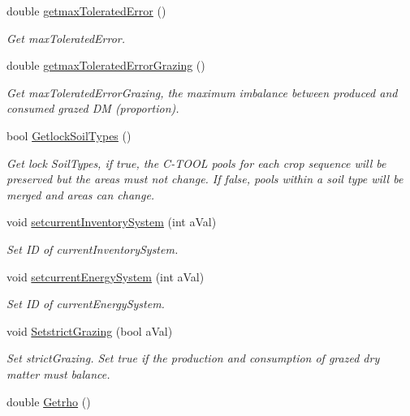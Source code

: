 \begin{DoxyCompactItemize}
double \mbox{\hyperlink{class_global_vars_ac5ca0cf675cbc4a5fc18f93f714b03bc}{getmax\+Tolerated\+Error}} ()
\begin{DoxyCompactList}\small\item\em Get max\+Tolerated\+Error. \end{DoxyCompactList}\item 
double \mbox{\hyperlink{class_global_vars_a6cf904264e03e8361a2e4c45b88fdfcd}{getmax\+Tolerated\+Error\+Grazing}} ()
\begin{DoxyCompactList}\small\item\em Get max\+Tolerated\+Error\+Grazing, the maximum imbalance between produced and consumed grazed DM (proportion). \end{DoxyCompactList}\item 
bool \mbox{\hyperlink{class_global_vars_aecb1271311c367bb97c21aa337a05447}{Getlock\+Soil\+Types}} ()
\begin{DoxyCompactList}\small\item\em Get lock Soil\+Types, if true, the C-\/\+T\+O\+OL pools for each crop sequence will be preserved but the areas must not change. If false, pools within a soil type will be merged and areas can change. \end{DoxyCompactList}\item 
void \mbox{\hyperlink{class_global_vars_a7aae0cfed8bbdf1ed6e57dbc3543ac7f}{setcurrent\+Inventory\+System}} (int a\+Val)
\begin{DoxyCompactList}\small\item\em Set ID of current\+Inventory\+System. \end{DoxyCompactList}\item 
void \mbox{\hyperlink{class_global_vars_a229e718d65ea9774c2991d516dcb67b0}{setcurrent\+Energy\+System}} (int a\+Val)
\begin{DoxyCompactList}\small\item\em Set ID of current\+Energy\+System. \end{DoxyCompactList}\item 
void \mbox{\hyperlink{class_global_vars_ab73daa54d4af7b798bb13364b91c6026}{Setstrict\+Grazing}} (bool a\+Val)
\begin{DoxyCompactList}\small\item\em Set strict\+Grazing. Set true if the production and consumption of grazed dry matter must balance. \end{DoxyCompactList}\item 
double \mbox{\hyperlink{class_global_vars_a4b40cfa99d20bf081c2fb84351a31185}{Getrho}} ()

\end{DoxyCompactItemize}
